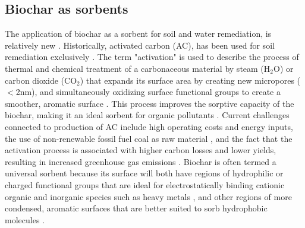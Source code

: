 \subsection{Biochar as sorbents}
The application of biochar as a sorbent for soil and water remediation, is relatively new \citep{beesley2011review}. Historically, activated carbon (AC), has been used for soil remediation exclusively \citep{hagemann2018activated}. The term "activation" is used to describe the process of thermal and chemical treatment of a carbonaceous material by steam ($\mathrm{H_2O}$) or carbon dioxide ($\mathrm{CO_2}$) that expands its surface area by creating new micropores ($<$2nm), and simultaneously oxidizing surface functional groups to create a smoother, aromatic surface \citep{sajjadi2019comprehensive}. This process improves the sorptive capacity of the biochar, making it an ideal sorbent for organic pollutants \citep{Ahmad2014}. Current challenges connected to production of AC include high operating costs and energy inputs, the use of non-renewable fossil fuel coal as raw material \citep{Li2019}, and the fact that the activation process is associated with higher carbon losses and lower yields, resulting in increased greenhouse gas emissions \citep{Sormo2021}. Biochar is often termed a universal sorbent because its surface will both have regions of hydrophilic or charged functional groups that are ideal for electrostatically binding cationic organic and inorganic species such as heavy metals \citep{silvani2019can,zhang2013sorption}, and other regions of more condensed, aromatic surfaces that are better suited to sorb hydrophobic molecules \citep{Cornelissen2005}.

